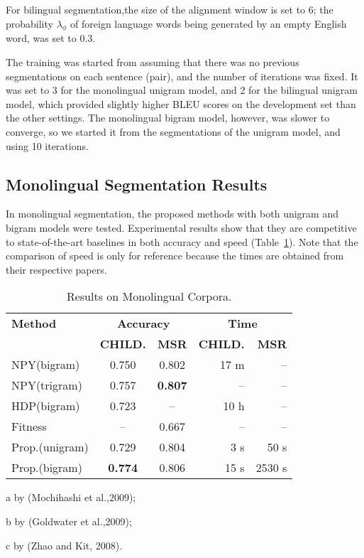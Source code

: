 \documentclass[11pt]{article}
\begin{document}
For bilingual segmentation,the
size of the alignment window is set to $6$; the 
probability $\lambda_\phi$ of foreign language words being generated by an empty
English word, was set to $0.3$.  

The training was started from assuming that there was no previous segmentations on each sentence (pair), and the number of iterations was fixed.  It was set to 3 for the monolingual unigram model, and 2 for the bilingual unigram model,  which provided slightly higher BLEU scores on the development set than the other settings.  The monolingual bigram model, however, was slower to converge, so we started it from the segmentations of the unigram model, and using 10 iterations.

\subsection{Monolingual Segmentation Results}

In monolingual segmentation, the proposed methods with both unigram and
bigram models were tested. Experimental results show that they are
competitive to state-of-the-art baselines in both accuracy and speed
(Table~\ref{tab:mono:acc}). Note that the comparison of speed is only
for reference because the times are obtained
from their respective papers.

\begin{table}{
\small
\begin{center}
\begin{threeparttable}
\begin{tabular}{|l|cc|rr|}
\hline
\bf Method &\multicolumn{2}{|c|}{\bf Accuracy} &\multicolumn{2}{|c|}{\bf Time} \\
 &\bf CHILD. & \bf MSR      &\bf CHILD. &\bf MSR \\
\hline
NPY(bigram)\tnote{a}  & 0.750       & 0.802     &17 m   & -- \\
NPY(trigram)\tnote{a} & 0.757       &{\bf 0.807}& --    & -- \\
HDP(bigram)\tnote{b}  & 0.723       & --        & 10 h  & --\\
Fitness\tnote{c}      & --          & 0.667     & --    & --     \\
\hline 
Prop.(unigram)          & 0.729       & 0.804   &       3 s & 50 s\\
Prop.(bigram)           & {\bf 0.774} & 0.806   &      15 s & 2530 s \\
\hline
\end{tabular}
\begin{tablenotes}
\item[a] by (Mochihashi et al.,2009);
\item[b] by (Goldwater et al.,2009);
\item[c] by (Zhao and Kit, 2008).
\end{tablenotes}
\end{threeparttable}
\end{center}
\caption{\label{tab:mono:acc} Results on Monolingual Corpora.}
}\end{table}
\end{document}
